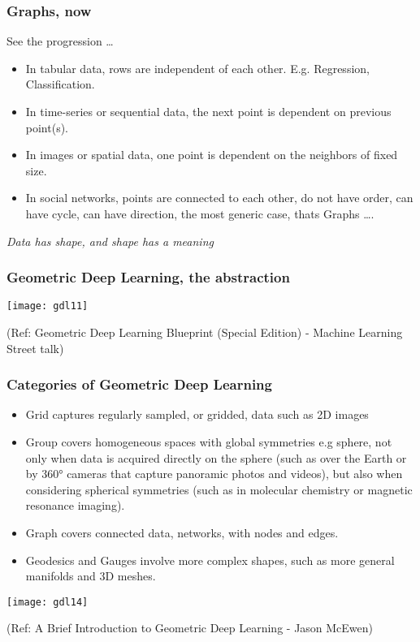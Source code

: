 \begin{frame}[fragile]\frametitle{Graphs, now}

See the progression \ldots

\begin{itemize}
\item In tabular data, rows are independent of each other. E.g. Regression, Classification.
\item In time-series or sequential data, the next point is dependent on previous point(s).
\item In images or spatial data, one point is dependent on the neighbors of fixed size.
\item In social networks, points are connected to each other, do not have order, can have cycle, can have direction, the most generic case, thats Graphs \ldots.
\end{itemize}
	
	{\em Data has shape, and shape has a meaning}
	
\end{frame}


\begin{frame}[fragile]\frametitle{Geometric Deep Learning, the abstraction}

\begin{center}
\texttt{[image: gdl11]}
\end{center}

{\tiny (Ref: Geometric Deep Learning Blueprint (Special Edition) - Machine Learning Street talk)}
	
\end{frame}

\begin{frame}[fragile]\frametitle{Categories of Geometric Deep Learning}


\begin{itemize}
\item Grid captures regularly sampled, or gridded, data such as 2D images
\item Group covers homogeneous spaces with global symmetries e.g sphere, not only when data is acquired directly on the sphere (such as over the Earth or by 360° cameras that capture panoramic photos and videos), but also when considering spherical symmetries (such as in molecular chemistry or magnetic resonance imaging). 
\item Graph covers connected data, networks, with nodes and edges.
\item Geodesics and Gauges involve more complex shapes, such as more general manifolds and 3D meshes.
\end{itemize}

\begin{center}
\texttt{[image: gdl14]}
\end{center}

{\tiny (Ref: A Brief Introduction to Geometric Deep Learning - Jason McEwen)}

\end{frame}


